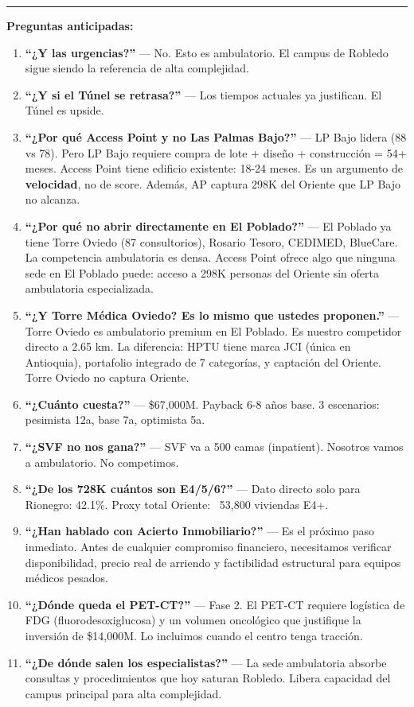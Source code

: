 \documentclass[11pt, a4paper]{article}
\begin{document}
\vspace{12pt}
\hrule
\vspace{6pt}
{\small\textcolor{hptu}{\textbf{Preguntas anticipadas:}}}
\begin{enumerate}[leftmargin=1cm]\small
  \item \textbf{``¿Y las urgencias?''} --- No. Esto es ambulatorio. El campus de Robledo sigue siendo la referencia de alta complejidad.
  \item \textbf{``¿Y si el Túnel se retrasa?''} --- Los tiempos actuales ya justifican. El Túnel es upside.
  \item \textbf{``¿Por qué Access Point y no Las Palmas Bajo?''} --- LP Bajo lidera (88 vs 78). Pero LP Bajo requiere compra de lote + diseño + construcción = 54+ meses. Access Point tiene edificio existente: 18-24 meses. Es un argumento de \textbf{velocidad}, no de score. Además, AP captura 298K del Oriente que LP Bajo no alcanza.
  \item \textbf{``¿Por qué no abrir directamente en El Poblado?''} --- El Poblado ya tiene Torre Oviedo (87 consultorios), Rosario Tesoro, CEDIMED, BlueCare. La competencia ambulatoria es densa. Access Point ofrece algo que ninguna sede en El Poblado puede: acceso a 298K personas del Oriente sin oferta ambulatoria especializada.
  \item \textbf{``¿Y Torre Médica Oviedo? Es lo mismo que ustedes proponen.''} --- Torre Oviedo es ambulatorio premium en El Poblado. Es nuestro competidor directo a 2.65 km. La diferencia: HPTU tiene marca JCI (única en Antioquia), portafolio integrado de 7 categorías, y captación del Oriente. Torre Oviedo no captura Oriente.
  \item \textbf{``¿Cuánto cuesta?''} --- \$67,000M. Payback 6-8 años base. 3 escenarios: pesimista 12a, base 7a, optimista 5a.
  \item \textbf{``¿SVF no nos gana?''} --- SVF va a 500 camas (inpatient). Nosotros vamos a ambulatorio. No competimos.
  \item \textbf{``¿De los 728K cuántos son E4/5/6?''} --- Dato directo solo para Rionegro: 42.1\%. Proxy total Oriente: ~53,800 viviendas E4+.
  \item \textbf{``¿Han hablado con Acierto Inmobiliario?''} --- Es el próximo paso inmediato. Antes de cualquier compromiso financiero, necesitamos verificar disponibilidad, precio real de arriendo y factibilidad estructural para equipos médicos pesados.
  \item \textbf{``¿Dónde queda el PET-CT?''} --- Fase 2. El PET-CT requiere logística de FDG (fluorodesoxiglucosa) y un volumen oncológico que justifique la inversión de \$14,000M. Lo incluimos cuando el centro tenga tracción.
  \item \textbf{``¿De dónde salen los especialistas?''} --- La sede ambulatoria absorbe consultas y procedimientos que hoy saturan Robledo. Libera capacidad del campus principal para alta complejidad.
\end{enumerate}
\end{document}
